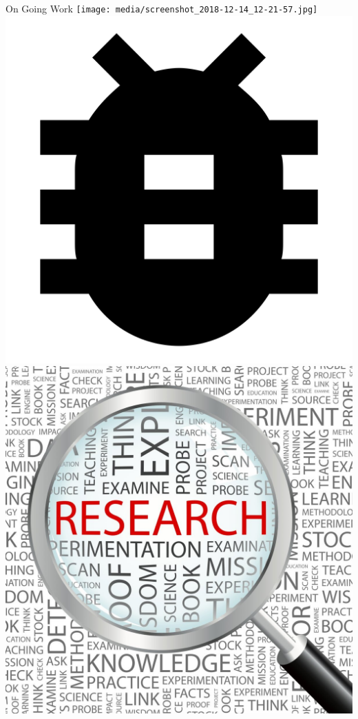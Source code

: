 \begin{frame}{On Going Work}
    \centering
    \pause%
    \texttt{[image: media/screenshot\_2018-12-14\_12-21-57.jpg]} %
    \newline
    \pause%
    \includegraphics[height=.4\pageheight]{media/9f4dd6559e.png}
    \pause%
    \includegraphics[height=.4\pageheight]{media/research.jpg}
\end{frame}

